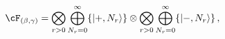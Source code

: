 \begin{equation}
\cF_{(\beta,\gamma)} = \bigotimes_{r>0} \bigoplus_{N_r=0}^{\infty} \{  |+,N_r \rangle \} \otimes
\bigotimes_{r>0} \bigoplus_{N_r=0}^{\infty} \{ |-,N_r \rangle \} \,,
\label{ghdemm}
\end{equation}

